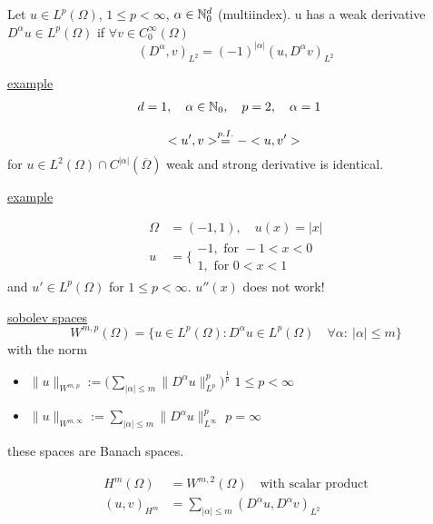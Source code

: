Let $ u \in L^p(\Omega)$, $1 \leq p< \infty$, $\alpha \in \mathbb{N}^d_0$ (multiindex).\enter
u has a weak derivative $ D^\alpha u \in L^p(\Omega) $ if $\forall v \in C^\infty_0(\Omega)$
\begin{equation*}
	(D^\alpha,v)_{L^2} = (-1)^{|\alpha|} (u,D^\alpha v)_{L^2}
\end{equation*}

\underline{example}
\begin{align*}
	d&= 1, \quad \alpha \in \mathbb{N}_0, \quad p=2, \quad \alpha=1
\end{align*}

\begin{equation*}
	<u',v> \overset{p.I.}{=} -<u,v'>\\
\end{equation*}
for $u \in L^2(\Omega)\cap C^{|\alpha|}( \overline{\Omega} )$ weak and strong derivative is identical.\enter

\underline{example}

\begin{align*}
	\Omega &= (-1,1),\quad u(x) = |x|\\
	u&=  \Bigg\{
	\begin{array}{l}
		-1,  \text{ for } -1 < x < 0\\
		1,  \text{ for } 0 < x <1 
	\end{array}
\end{align*}
and $u' \in L^p(\Omega)$ for $1 \leq p < \infty$. $u''(x)$ does not work!\enter

\underline{sobolev spaces}
\begin{equation*}
	W^{m,p}(\Omega) = \big\{ u\in L^p(\Omega) : D^\alpha u \in L^p(\Omega) \quad \forall \alpha:\ |\alpha|\leq m \big\}
\end{equation*}
with the norm
\begin{itemize}
	\item $\| u\|_{W^{m,p}} := \Big ( \displaystyle\sum_{|\alpha|\leq m}  \| D^\alpha u \|^p_{L^p}  \Big )^{\frac{1}{p}}$ \qquad $1\leq p < \infty$
	\item  $\| u\|_{W^{m,\infty}} :=  \displaystyle\sum_{|\alpha|\leq m}  \| D^\alpha u \|^p_{L^\infty}  $ \qquad $ p = \infty$
\end{itemize}


these spaces are Banach spaces.\enter
 
\begin{align*}
	H^m(\Omega) &= W^{m,2}(\Omega) \quad \text{with scalar product}\\
	(u,v)_{H^m} &= \displaystyle \sum_{|\alpha| \leq m} (D^\alpha u, D^\alpha v)_{L^2}
\end{align*}
 
